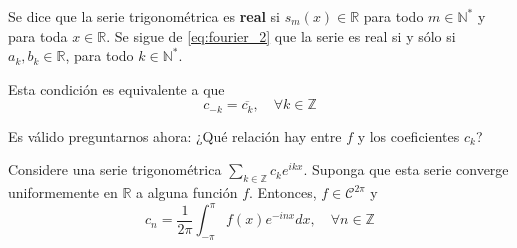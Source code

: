\documentclass[12pt]{report}
\theoremstyle{largebreak}
\begin{document}
    \begin{mydef}
        Se dice que la serie trigonométrica es \textbf{real} si $s_m(x)\in\mathbb{R}$ para todo $m\in\mathbb{N}^*$ y para toda $x\in\mathbb{R}$. Se sigue de \ref{eq:fourier_2} que la serie es real si y sólo si $a_k,b_k\in\mathbb{R}$, para todo $k\in\mathbb{N}^*$.
        
        Esta condición es equivalente a que
        \begin{equation*}
            c_{-k}=\overline{c_k},\quad\forall k\in\mathbb{Z}
        \end{equation*}
    \end{mydef}

    Es válido preguntarnos ahora: ¿Qué relación hay entre $f$ y los coeficientes $c_k$?
    
    \begin{propo}
        Considere una serie trigonométrica $\sum_{k\in\mathbb{Z}}c_k e^{ ikx}$. Suponga que esta serie converge uniformemente en $\mathbb{R}$ a alguna función $f$. Entonces, $f\in\mathcal{C}^{2\pi}$ y
        \begin{equation*}
            c_n=\frac{1}{2\pi}\int_{-\pi}^\pi f(x)e^{ -inx}dx,\quad\forall n\in\mathbb{Z}
        \end{equation*}
    \end{propo}
\end{document}
